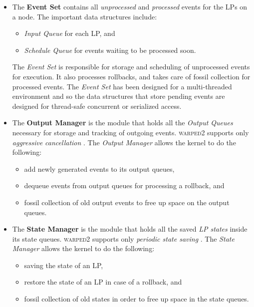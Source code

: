 \documentclass[11pt]{book}
\begin{document}
\begin{itemize}

\item The \textbf{Event Set} contains all \emph{unprocessed} and \emph{processed} events for the LPs on a
  node. The important data structures include:
    
  \begin{itemize}
  \item \emph{Input Queue} for each LP, and 
  \item \emph{Schedule Queue} for events waiting to be processed soon.
  \end{itemize}
    
  \noindent
  The \emph{Event Set} is responsible for storage and scheduling of unprocessed events for execution.  It also
  processes rollbacks, and takes care of fossil collection for processed events.  The \emph{Event Set} has
  been designed for a multi-threaded environment and so the data structures that store pending events are
  designed for thread-safe concurrent or serialized access.

\item The \textbf{Output Manager} is the module that holds all the \emph{Output Queues} necessary for storage
  and tracking of outgoing events.  \textsc{warped2} supports only \emph{aggressive cancellation}
  \cite{fujimoto-90}.  The \emph{Output Manager} allows the kernel to do the following:
    
  \begin{itemize}
  \item add newly generated events to its output queues,
  \item dequeue events from output queues for processing a rollback, and 
  \item fossil collection of old output events to free up space on the output queues.
  \end{itemize}
  
\item The \textbf{State Manager} is the module that holds all the saved \emph{LP states} inside its state
  queues.  \textsc{warped2} supports only \emph{periodic state saving} \cite{fleischmann-95}. The \emph{State
    Manager} allows the kernel to do the following:
    
  \begin{itemize}
  \item saving the state of an LP,
  \item restore the state of an LP in case of a rollback, and
  \item fossil collection of old states in order to free up space in the state queues.
  \end{itemize}

\end{itemize}
\end{document}
